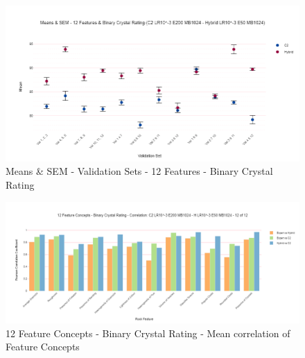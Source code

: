 \begin{figure}[H]
  \centering
    \includegraphics[width=\textwidth]{images/Means & SEM - 12 Features & Binary Crystal Rating (C2 LR10^-3 E200 MB1024 - Hybrid LR10^-3 E50 MB1024).png}
    \caption{Means \& SEM - Validation Sets - 12 Features - Binary Crystal Rating} \label{fig:Means & SEM - Validation Sets - 12 Features - Binary Crystal Rating}
\end{figure}


\begin{figure}[H]
  \centering
    \includegraphics[width=\textwidth]{images/12 Feature Concepts - Binary Crystal Rating - Correlation- C2 LR10^-3 E200 MB1024 - H LR10^-3 E50 MB1024 - 12 of 12.png}
    \caption{12 Feature Concepts - Binary Crystal Rating - Mean correlation of Feature Concepts} \label{fig:12 Feature Concepts - Binary Crystal Rating - Mean correlation of Feature Concepts}
\end{figure}

